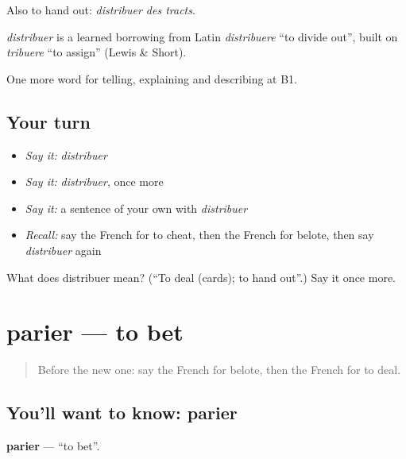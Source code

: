 Also to hand out: \emph{distribuer des tracts}.

\begin{cousinweb}
\emph{distribuer} is a learned borrowing from Latin \emph{distribuere} \textquotedblleft{}to divide out\textquotedblright{}, built on \emph{tribuere} \textquotedblleft{}to assign\textquotedblright{} (Lewis \& Short).
\end{cousinweb}

\begin{grammarlens}[title={What you've built}]
One more word for telling, explaining and describing at B1.
\end{grammarlens}

\subsection*{Your turn}
\begin{itemize}
\raggedright
  \item \emph{Say it:} \emph{distribuer}
  \item \emph{Say it:} \emph{distribuer}, once more
  \item \emph{Say it:} a sentence of your own with \emph{distribuer}
  \item \emph{Recall:} say the French for to cheat, then the French for belote, then say \emph{distribuer} again
\end{itemize}

\begin{tcolorbox}[breakable,colback=teal!4,colframe=teal!35!black,title={Before you move on}]
What does distribuer mean? (\textquotedblleft{}To deal (cards); to hand out\textquotedblright{}.) Say it once more.
\end{tcolorbox}
\section[parier]{parier — to bet}

\label{lesson:FR-C500-parier}



\begin{quote}
Before the new one: say the French for belote, then the French for to deal.
\end{quote}

\subsection*{You'll want to know: parier}
\textbf{parier} — \textquotedblleft{}to bet\textquotedblright{}.

